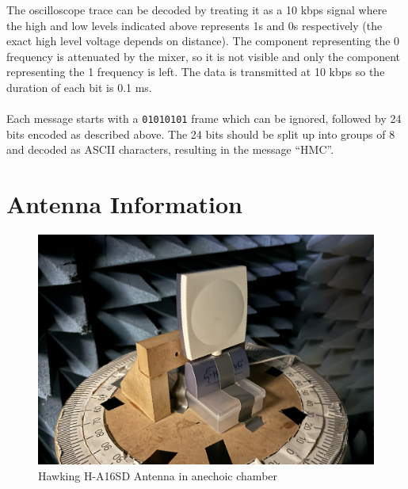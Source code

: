 \documentclass[letterpaper,12pt]{article}
\begin{document}
The oscilloscope trace can be decoded by treating it as a 10 kbps signal where the high and low levels indicated above represents 1s and 0s respectively (the exact high level voltage depends on distance). The component representing the 0 frequency is attenuated by the mixer, so it is not visible and only the component representing the 1 frequency is left. The data is transmitted at 10 kbps so the duration of each bit is 0.1 ms.
\\
\\
\noindent
Each message starts with a \texttt{01010101} frame which can be ignored, followed by 24 bits encoded as described above. The 24 bits should be split up into groups of 8 and decoded as ASCII characters, resulting in the message ``HMC''.

\newpage
\section{Antenna Information}
\begin{figure}[H]
	\begin{centering}
		\includegraphics[width=0.8\columnwidth]{figures/antenna_anechoic.png}
		\caption{Hawking H-A16SD Antenna in anechoic chamber}
	\end{centering}
\end{figure}
\end{document}
